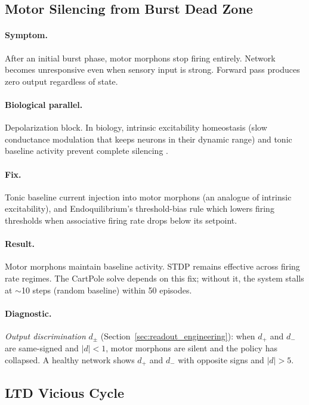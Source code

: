 \subsection{Motor Silencing from Burst Dead Zone}

\paragraph{Symptom.}
After an initial burst phase, motor morphons stop firing entirely. Network becomes unresponsive even when sensory input is strong. Forward pass produces zero output regardless of state.

\paragraph{Biological parallel.}
Depolarization block. In biology, intrinsic excitability homeostasis (slow conductance modulation that keeps neurons in their dynamic range) and tonic baseline activity prevent complete silencing \cite{turrigiano1998activity}.

\paragraph{Fix.}
Tonic baseline current injection into motor morphons (an analogue of intrinsic excitability), and Endoquilibrium's threshold-bias rule which lowers firing thresholds when associative firing rate drops below its setpoint.

\paragraph{Result.}
Motor morphons maintain baseline activity. STDP remains effective across firing rate regimes. The CartPole solve depends on this fix; without it, the system stalls at $\sim$10 steps (random baseline) within 50 episodes.

\paragraph{Diagnostic.}
\emph{Output discrimination} $d_\pm$ (Section~\ref{sec:readout_engineering}): when $d_+$ and $d_-$ are same-signed and $|d| < 1$, motor morphons are silent and the policy has collapsed. A healthy network shows $d_+$ and $d_-$ with opposite signs and $|d| > 5$.

\subsection{LTD Vicious Cycle}

